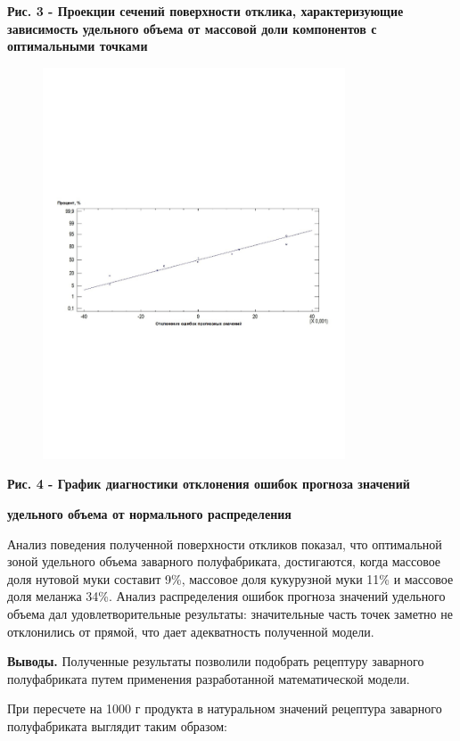{\bfseries Рис. 3 - Проекции сечений поверхности отклика, характеризующие
зависимость удельного объема от массовой доли компонентов с оптимальными
точками}

\begin{figure}[H]
	\centering
	\includegraphics[width=0.8\textwidth]{media/pish/image4}
	\caption*{}
\end{figure}


{\bfseries Рис. 4 - График диагностики отклонения ошибок прогноза значений}

{\bfseries удельного объема от нормального распределения}

Анализ поведения полученной поверхности откликов показал, что
оптимальной зоной удельного объема заварного полуфабриката, достигаются,
когда массовое доля нутовой муки составит 9\%, массовое доля кукурузной
муки 11\% и массовое доля меланжа 34\%. Анализ распределения ошибок
прогноза значений удельного объема дал удовлетворительные результаты:
значительные часть точек заметно не отклонились от прямой, что дает
адекватность полученной модели.

{\bfseries Выводы.} Полученные результаты позволили подобрать рецептуру
заварного полуфабриката путем применения разработанной математической
модели.

При пересчете на 1000 г продукта в натуральном значений рецептура
заварного полуфабриката выглядит таким образом:

